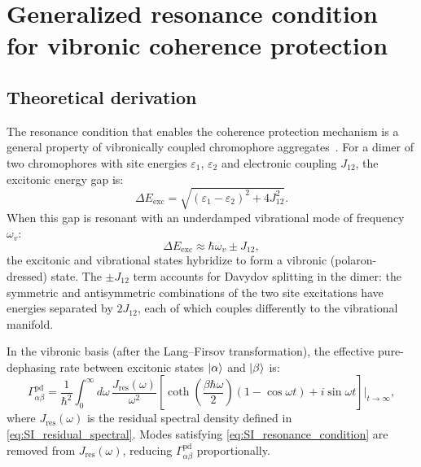 \documentclass[11pt,a4paper]{article}
\begin{document}

\section{Generalized resonance condition for vibronic coherence protection}
\label{SI-sec:resonance}

\subsection{Theoretical derivation}

The resonance condition that enables the coherence protection mechanism is a general property of vibronically coupled chromophore aggregates~\cite{Chin2013,Christensson2012}. For a dimer of two chromophores with site energies $\varepsilon_1$, $\varepsilon_2$ and electronic coupling $J_{12}$, the excitonic energy gap is:
\begin{equation}\label{eq:SI_exciton_gap}
\Delta E_{\mathrm{exc}} = \sqrt{(\varepsilon_1 - \varepsilon_2)^2 + 4J_{12}^2}.
\end{equation}
When this gap is resonant with an underdamped vibrational mode of frequency $\omega_v$:
\begin{equation}\label{eq:SI_resonance_condition}
\Delta E_{\mathrm{exc}} \approx \hbar\omega_v \pm J_{12},
\end{equation}
the excitonic and vibrational states hybridize to form a vibronic (polaron-dressed) state. The $\pm J_{12}$ term accounts for Davydov splitting in the dimer: the symmetric and antisymmetric combinations of the two site excitations have energies separated by $2J_{12}$, each of which couples differently to the vibrational manifold.

In the vibronic basis (after the Lang--Firsov transformation), the effective pure-dephasing rate between excitonic states $\ket{\alpha}$ and $\ket{\beta}$ is:
\begin{equation}\label{eq:SI_dephasing_rate}
\Gamma_{\alpha\beta}^{\mathrm{pd}} = \frac{1}{\hbar^2} \int_0^\infty d\omega\, \frac{J_{\mathrm{res}}(\omega)}{\omega^2} \left[\coth\!\left(\frac{\beta\hbar\omega}{2}\right)(1 - \cos\omega t) + i\sin\omega t\right]\bigg|_{t\to\infty},
\end{equation}
where $J_{\mathrm{res}}(\omega)$ is the residual spectral density defined in \cref{eq:SI_residual_spectral}.
Modes satisfying \cref{eq:SI_resonance_condition} are removed from $J_{\mathrm{res}}(\omega)$, reducing $\Gamma_{\alpha\beta}^{\mathrm{pd}}$ proportionally.
\end{document}
